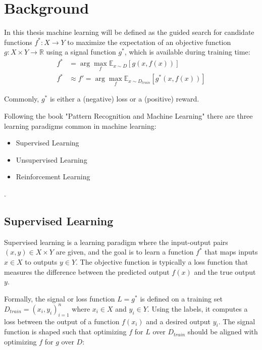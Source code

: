 
\chapter{Background}
\label{chapter:Background}
In this thesis machine learning will be defined as the guided search for candidate functions $f^*: X \to Y$ to maximize the expectation of an objective function 
${g: X \times Y \to \mathbb{R}}$ using a signal function $g^*$, which is available during training time:
\begin{equation}
    \begin{aligned}
        f^* &= \arg\max_{f} \mathbb{E}_{x \sim D}[g(x,f(x))] \\
        f^* &\approx f' = \arg\max_{f} \mathbb{E}_{x \sim D_{train}}[g^*(x,f(x))]
    \end{aligned}
\end{equation}

Commonly, $g^*$ is either a (negative) loss or a (positive) reward.

Following the book "Pattern Recognition and Machine Learning" \cite{bishop} there are three learning paradigms common in machine learning: 
\begin{itemize}
	\item Supervised Learning
	\item Unsupervised Learning
	\item Reinforcement Learning
\end{itemize} .

\section{Supervised Learning}
\label{section:super_learn}
Supervised learning is a learning paradigm where the input-output pairs $(x,y) \in X \times Y$ are given, and the goal is to learn a function 
$f^*$ that maps inputs $x \in X$ to outputs $y \in Y$. The objective function is typically a loss function that measures the difference between 
the predicted output $f(x)$ and the true output $y$.

Formally, the signal or loss function $L = g^*$ is defined on a training set $D_{train} = {(x_i,y_i)}_{i=1}^n$ where $x_i \in X$ and $y_i \in Y$. Using the 
labels, it computes a loss between the output of a function $f(x_i)$ and a desired output $y_i$. The signal function is shaped such that optimizing $f$ for $L$ 
over $D_{train}$ should be aligned with optimizing $f$ for $g$ over $D$:

